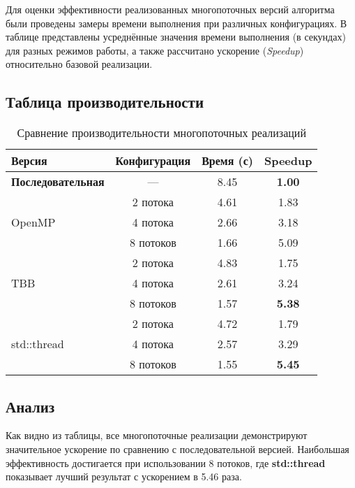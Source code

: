 \documentclass[12pt]{article}
\begin{document}
\hspace*{1.25em}Для оценки эффективности реализованных многопоточных версий алгоритма были проведены замеры времени выполнения при различных конфигурациях. В таблице представлены усреднённые значения времени выполнения (в секундах) для разных режимов работы, а также рассчитано ускорение (\textit{Speedup}) относительно базовой реализации.

\subsection{Таблица производительности}

\renewcommand{\arraystretch}{1.4}
\begin{table}[H]
\centering
\footnotesize
\begin{tabular}{|l|c|c|c|}
\hline
\textbf{Версия} & \textbf{Конфигурация} & \textbf{Время (с)} & \textbf{Speedup} \\
\hline
\textbf{Последовательная} & — & 8.45 & \textbf{1.00} \\
\hline
\multirow{3}{*}{OpenMP} 
  & 2 потока & 4.61 & 1.83 \\
  & 4 потока & 2.66 & 3.18 \\
  & 8 потоков & 1.66 & 5.09 \\
\hline
\multirow{3}{*}{TBB} 
  & 2 потока & 4.83 & 1.75 \\
  & 4 потока & 2.61 & 3.24 \\
  & 8 потоков & 1.57 & \textbf{5.38} \\
\hline
\multirow{3}{*}{std::thread} 
  & 2 потока & 4.72 & 1.79 \\
  & 4 потока & 2.57 & 3.29 \\
  & 8 потоков & 1.55 & \textbf{5.45} \\
\hline
\end{tabular}
\caption{Сравнение производительности многопоточных реализаций}
\label{tab:thread_perf_updated}
\end{table}

\subsection{Анализ}
\hspace{1.25em}Как видно из таблицы, все многопоточные реализации демонстрируют значительное ускорение по сравнению с последовательной версией. Наибольшая эффективность достигается при использовании 8 потоков, где \textbf{std::thread} показывает лучший результат с ускорением в 5.46 раза.
\end{document}
